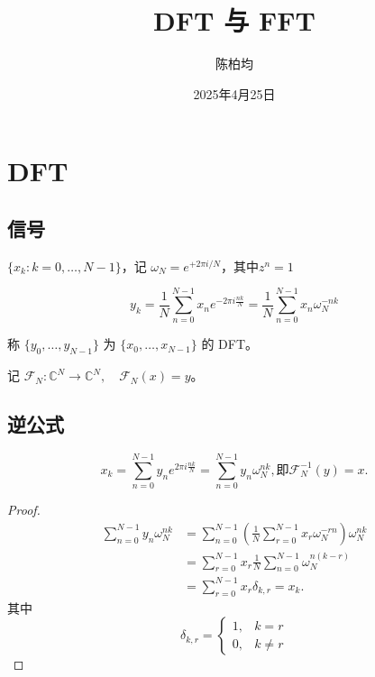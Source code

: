 \documentclass[12pt,a4paper]{article}
\title{DFT 与 FFT}
\author{陈柏均}
\date{2025年4月25日}
\newcommand{\C}{\mathbb{C}}
\numberwithin{subsection}{section}   %
\numberwithin{subsubsection}{subsection}
\theoremstyle{plain}
\theoremstyle{definition}
\theoremstyle{remark}
\theoremstyle{remark}
\begin{document}
	\maketitle
		\newpage
		\tableofcontents  %
			\newpage
	
	\section{DFT}
	
	\subsection{信号}
	 $\{x_k: k=0,\dots,N-1\}$，记 $\omega_N = e^{+2\pi i / N}$，其中$z^n=1$
	
	\begin{equation}
		y_k = \frac{1}{N} \sum_{n=0}^{N-1} x_n e^{-2\pi i \frac{nk}{N}} = \frac{1}{N} \sum_{n=0}^{N-1} x_n \omega_N^{-nk}
	\end{equation}
	
	称 $\{y_0,\dots,y_{N-1}\}$ 为 $\{x_0,\dots,x_{N-1}\}$ 的 DFT。
	
	记 $\mathcal{F}_N: \C^N \rightarrow \C^N,\quad \mathcal{F}_N(x) = y$。
	

		\subsection{ 逆公式}
		
		\begin{equation}
			x_k = \sum_{n=0}^{N-1} y_n e^{2\pi i \frac{nk}{N}} = \sum_{n=0}^{N-1} y_n \omega_N^{nk}, \text{即} \mathcal{F}_N^{-1}(y) = x.
		\end{equation}
		
		\begin{proof}
	\begin{equation}
		\begin{aligned}
			\sum_{n=0}^{N-1} y_n \omega_N^{nk} 
			&= \sum_{n=0}^{N-1} \left( \frac{1}{N} \sum_{r=0}^{N-1} x_r \omega_N^{-rn} \right) \omega_N^{nk} \\[8pt]
			&= \sum_{r=0}^{N-1} x_r \frac{1}{N} \sum_{n=0}^{N-1} \omega_N^{n(k - r)} \\[8pt]
			&= \sum_{r=0}^{N-1} x_r \delta_{k,r} = x_k.
		\end{aligned}
	\end{equation}
		其中
			\begin{equation}
				\delta_{k,r} = 
				\begin{cases} 
					1, & k = r \\[8pt]
					0, & k \neq r 
				\end{cases}
			\end{equation}
			
\end{proof}
\end{document}
